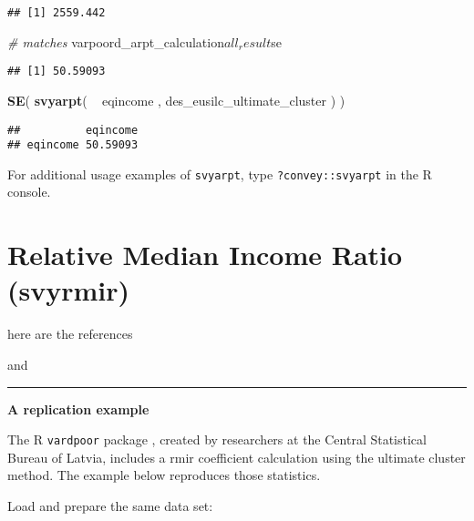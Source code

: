 \documentclass[]{book}
\newenvironment{Shaded}{\begin{snugshade}}{\end{snugshade}}
\newcommand{\KeywordTok}[1]{\textcolor[rgb]{0.13,0.29,0.53}{\textbf{{#1}}}}
\newcommand{\StringTok}[1]{\textcolor[rgb]{0.31,0.60,0.02}{{#1}}}
\newcommand{\CommentTok}[1]{\textcolor[rgb]{0.56,0.35,0.01}{\textit{{#1}}}}
\newcommand{\NormalTok}[1]{{#1}}
\theoremstyle{definition}
\theoremstyle{definition}
\theoremstyle{remark}
\begin{document}
\begin{verbatim}
## [1] 2559.442
\end{verbatim}

\begin{Shaded}
\begin{Highlighting}[]
\CommentTok{# matches}
\NormalTok{varpoord_arpt_calculation$all_result$se}
\end{Highlighting}
\end{Shaded}

\begin{verbatim}
## [1] 50.59093
\end{verbatim}

\begin{Shaded}
\begin{Highlighting}[]
\KeywordTok{SE}\NormalTok{( }\KeywordTok{svyarpt}\NormalTok{( ~}\StringTok{ }\NormalTok{eqincome , des_eusilc_ultimate_cluster ) )}
\end{Highlighting}
\end{Shaded}

\begin{verbatim}
##          eqincome
## eqincome 50.59093
\end{verbatim}

For additional usage examples of \texttt{svyarpt}, type
\texttt{?convey::svyarpt} in the R console.

\section{Relative Median Income Ratio
(svyrmir)}\label{relative-median-income-ratio-svyrmir}

here are the references

\citep{osier2009} and \citep{deville1999}

\begin{center}\rule{0.5\linewidth}{\linethickness}\end{center}

\textbf{A replication example}

The R \texttt{vardpoor} package \citep{vardpoor}, created by researchers
at the Central Statistical Bureau of Latvia, includes a rmir coefficient
calculation using the ultimate cluster method. The example below
reproduces those statistics.

Load and prepare the same data set:
\end{document}
